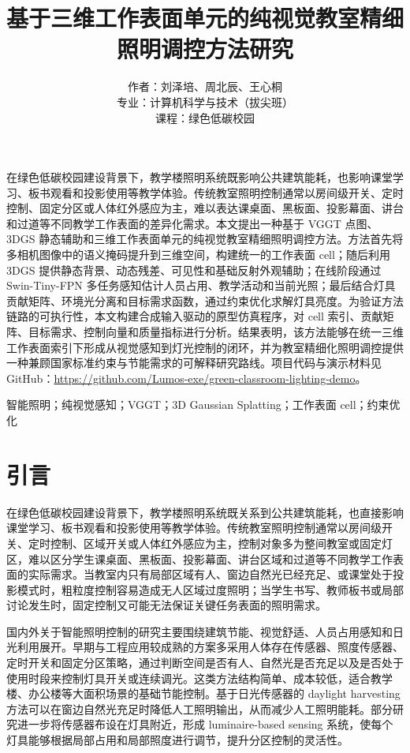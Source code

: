 \documentclass[UTF8,a4paper,zihao=-4]{ctexart}
\title{\heiti 基于三维工作表面单元的纯视觉教室精细照明调控方法研究}
\author{作者：刘泽培、周北辰、王心桐\\专业：计算机科学与技术（拔尖班）\\课程：绿色低碳校园}
\date{}
\renewenvironment{abstract}
  {\par\small\noindent{\heiti 摘要：}}
  {\par\vspace{0.8em}\normalsize}
\begin{document}
\maketitle

\begin{abstract}
在绿色低碳校园建设背景下，教学楼照明系统既影响公共建筑能耗，也影响课堂学习、板书观看和投影使用等教学体验。传统教室照明控制通常以房间级开关、定时控制、固定分区或人体红外感应为主，难以表达课桌面、黑板面、投影幕面、讲台和过道等不同教学工作表面的差异化需求。本文提出一种基于 VGGT 点图、3DGS 静态辅助和三维工作表面单元的纯视觉教室精细照明调控方法。方法首先将多相机图像中的语义掩码提升到三维空间，构建统一的工作表面 cell；随后利用 3DGS 提供静态背景、动态残差、可见性和基础反射外观辅助；在线阶段通过 Swin-Tiny-FPN 多任务感知估计人员占用、教学活动和当前光照；最后结合灯具贡献矩阵、环境光分离和目标需求函数，通过约束优化求解灯具亮度。为验证方法链路的可执行性，本文构建合成输入驱动的原型仿真程序，对 cell 索引、贡献矩阵、目标需求、控制向量和质量指标进行分析。结果表明，该方法能够在统一三维工作表面索引下形成从视觉感知到灯光控制的闭环，并为教室精细化照明调控提供一种兼顾国家标准约束与节能需求的可解释研究路线。项目代码与演示材料见 GitHub：\url{https://github.com/Lumos-exe/green-classroom-lighting-demo}。

\par{}智能照明；纯视觉感知；VGGT；3D Gaussian Splatting；工作表面 cell；约束优化
\end{abstract}

\section{引言}

在绿色低碳校园建设背景下，教学楼照明系统既关系到公共建筑能耗，也直接影响课堂学习、板书观看和投影使用等教学体验。传统教室照明控制通常以房间级开关、定时控制、区域开关或人体红外感应为主，控制对象多为整间教室或固定灯区，难以区分学生课桌面、黑板面、投影幕面、讲台区域和过道等不同教学工作表面的实际需求。当教室内只有局部区域有人、窗边自然光已经充足、或课堂处于投影模式时，粗粒度控制容易造成无人区域过度照明；当学生书写、教师板书或局部讨论发生时，固定控制又可能无法保证关键任务表面的照明需求。

国内外关于智能照明控制的研究主要围绕建筑节能、视觉舒适、人员占用感知和日光利用展开。早期与工程应用较成熟的方案多采用人体存在传感器、照度传感器、定时开关和固定分区策略，通过判断空间是否有人、自然光是否充足以及是否处于使用时段来控制灯具开关或连续调光\cite{haq2014review,pandharipande2015smart}。这类方法结构简单、成本较低，适合教学楼、办公楼等大面积场景的基础节能控制。基于日光传感器的 daylight harvesting 方法可以在窗边自然光充足时降低人工照明输出，从而减少人工照明能耗\cite{delvaeye2016analysis}。部分研究进一步将传感器布设在灯具附近，形成 luminaire-based sensing 系统，使每个灯具能够根据局部占用和局部照度进行调节，提升分区控制的灵活性。
\end{document}
